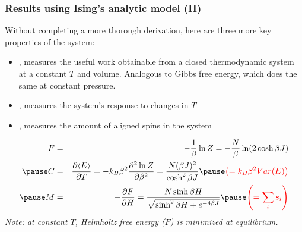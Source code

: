 \documentclass[hyperref={colorlinks=true}]{beamer}
\begin{document}

\begin{frame}%
  \frametitle{Results using Ising's analytic model (II)}

    Without completing a more thorough derivation, here are three more key properties of the system:
    \begin{itemize}
      \item<1-> , measures the useful work obtainable from a closed thermodynamic system at a constant $T$ and volume. Analogous to Gibbs free energy, which does the same at constant pressure.
      \item<2-> , measures the system's response to changes in $T$
      \item<4-> , measures the amount of aligned spins in the system
    \end{itemize}
%
  \begin{eqnarray}
           F &=& -\frac{1}{\beta} \ln Z = -\frac{N}{\beta} \ln (2 \cosh \beta J) \\ \pause   
           C &=& \frac{\partial \mean{E}}{\partial T} = -\kB \beta^2 \frac{\partial^2 \ln Z}{\partial \beta^2} = \frac{N (\beta J)^2}{\cosh^2 \beta J} \pause \textcolor{red}{\left(= \kB \beta^2 Var(E) \right)} \label{eq:specificheat} \\  \pause 
           M &=& -\frac{\partial F}{\partial H} = \frac{N \sinh \beta H}{\sqrt{\sinh^2 \beta H + e^{-4 \beta J}}}  \pause \textcolor{red}{\left(= \sum_i \spini \right)}  \label{eq:magnetization}
  \end{eqnarray} 
  \pause
  \textit{Note: at constant $T$, Helmholtz free energy ($F$) is minimized at equilibrium.}
  
\end{frame}

\end{document}
